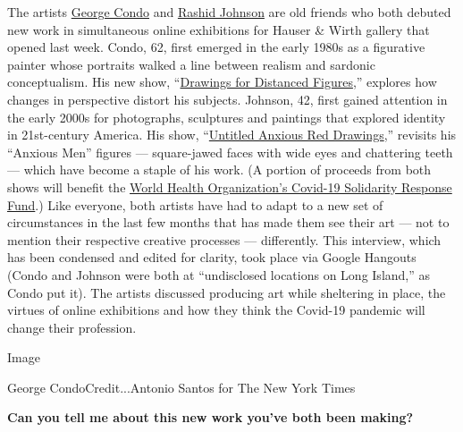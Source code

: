The artists
\href{https://www.nytimes3xbfgragh.onion/2016/11/18/t-magazine/art/george-condo-picasso-matisse-museum-berggruen.html}{George
Condo} and
\href{https://www.nytimes3xbfgragh.onion/2016/09/08/t-magazine/art/rashid-johnson-hauser-wirth-antoine-baldwin.html}{Rashid
Johnson} are old friends who both debuted new work in simultaneous
online exhibitions for Hauser \& Wirth gallery that opened last week.
Condo, 62, first emerged in the early 1980s as a figurative painter
whose portraits walked a line between realism and sardonic
conceptualism. His new show,
``\href{https://www.vip-hauserwirth.com/george-condo-drawings-for-distanced-figures/}{Drawings
for Distanced Figures},'' explores how changes in perspective distort
his subjects. Johnson, 42, first gained attention in the early 2000s for
photographs, sculptures and paintings that explored identity in
21st-century America. His show,
``\href{https://www.vip-hauserwirth.com/rashid-johnson-untitled-anxious-red-drawings/}{Untitled
Anxious Red Drawings},'' revisits his ``Anxious Men'' figures ---
square-jawed faces with wide eyes and chattering teeth --- which have
become a staple of his work. (A portion of proceeds from both shows will
benefit the
\href{https://www.who.int/emergencies/diseases/novel-coronavirus-2019/donate\#:~:text=The\%20Covid\%2D19\%20Solidarity,needs\%20are\%20the\%20greatest.}{World
Health Organization's Covid-19 Solidarity Response Fund}.) Like
everyone, both artists have had to adapt to a new set of circumstances
in the last few months that has made them see their art --- not to
mention their respective creative processes --- differently. This
interview, which has been condensed and edited for clarity, took place
via Google Hangouts (Condo and Johnson were both at ``undisclosed
locations on Long Island,'' as Condo put it). The artists discussed
producing art while sheltering in place, the virtues of online
exhibitions and how they think the Covid-19 pandemic will change their
profession.

Image

George CondoCredit...Antonio Santos for The New York Times

\textbf{Can you tell me about this new work you've both been making?}

